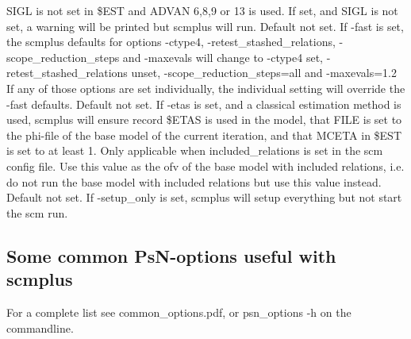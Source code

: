 \documentclass[hideglossary,notoc,hidelof,hidelot,hideTheSignaturePage,hideLinkCurrent,hideloa,pdfLatex,noClient,notitle,hideConfidential]{PMXstyle-20190820}
\begin{document}
\begin{optionlist}
SIGL is not set in \$EST and ADVAN 6,8,9 or 13 is used.
If set, and SIGL is not set, a warning will be printed but scmplus will run.
\nextopt
{}
Default not set. 
If -fast is set, the scmplus defaults for options -ctype4, -retest\_stashed\_relations,
-scope\_reduction\_steps and -maxevals will change to -ctype4 set, 
-retest\_stashed\_relations unset, -scope\_reduction\_steps=all and -maxevals=1.2\\ 
If any of those options are set individually, the individual setting will override the
-fast defaults.
\nextopt
{}
Default not set. 
If -etas is set, and a classical estimation method is used, scmplus will ensure record \$ETAS is used
in the model, that FILE is set to the phi-file of the base model of the current iteration,
and that MCETA in \$EST is set to at least 1.
\nextopt
{}
Only applicable when included\_relations is set in the scm config file.
Use this value as the ofv of the base model with included relations,
i.e. do not run the base model with included relations but use
this value instead.
\nextopt
{}
Default not set. 
If -setup\_only is set, scmplus will setup everything but not start the scm run.
\nextopt
\end{optionlist}

\subsection{Some common PsN-options useful with scmplus}
For a complete list see common\_options.pdf, or psn\_options -h on the commandline.


\end{document}
